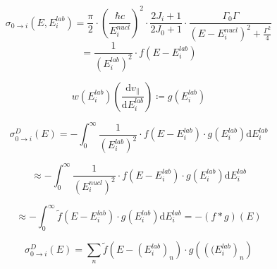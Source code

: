 \documentclass{article}
\begin{document}
\begin{equation}
\label{convolution_f_1}
\sigma_{0 \to i} (E, E_i^{lab}) = \frac{\pi}{2} \cdot \left( \frac{\hbar c}{E_i^{nucl}} \right)^2 \cdot \frac{2 J_i + 1}{2 J_0 + 1} \cdot \frac{\Gamma_0 \Gamma}{\left( E - E_i^{nucl} \right)^2 + \frac{\Gamma^2}{4}} 
\end{equation}
\begin{equation}
\label{convolution_f_1}
= \frac{1}{\left( E_i^{lab} \right)^2} \cdot f\left( E - E^{lab}_i \right)
\end{equation}

\begin{equation}
\label{convolution_g}
	w \left( E^{lab}_i \right)\left( \frac{\mathrm{d} v_\parallel}{\mathrm{d} E_i^{lab}} \right) \coloneqq g \left( E^{lab}_i \right)
\end{equation}

\begin{equation}
\label{convolution_approximation_1}
\sigma^{D}_{0 \to i} (E) = - \int_{0}^{\infty} \frac{1}{\left( E_i^{lab} \right)^2} \cdot f\left( E - E^{lab}_i \right) \cdot g \left( E^{lab}_i \right) \mathrm{d} E_i^{lab}
\end{equation}

\begin{equation}
\label{convolution_approximation_2}
\approx - \int_{0}^{\infty} \frac{1}{\left( E_i^{nucl} \right)^2} \cdot f\left( E - E^{lab}_i \right) \cdot g \left( E^{lab}_i \right) \mathrm{d} E_i^{lab}
\end{equation}

\begin{equation}
\label{convolution_approximation_3}
	\approx - \int_{0}^{\infty} \tilde{f}\left( E - E^{lab}_i \right) \cdot g \left( E^{lab}_i \right) \mathrm{d} E_i^{lab} = -\left( f * g \right) \left( E \right)
\end{equation}

\begin{equation}
\label{discrete_convolution}
	\sigma^{D}_{0 \to i} (E) = \sum_n \tilde{f} \left( E -  \left(E^{lab}_i\right)_n \right) \cdot g \left( \left( (E^{lab}_i\right)_n \right)
\end{equation}
\newpage

{}

\end{document}
